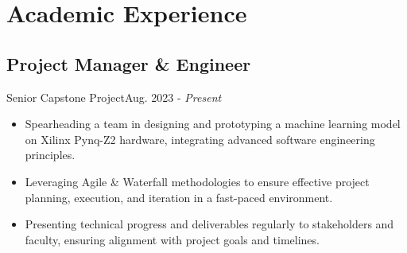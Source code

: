 \section{Academic Experience}
\subsection{Project Manager \& Engineer}{Senior Capstone Project}{Aug. 2023 - \textit{Present}}
\begin{itemize}
    \item Spearheading a team in designing and prototyping a machine learning model on Xilinx Pynq-Z2 hardware, integrating advanced software engineering principles.
    \item Leveraging Agile \& Waterfall methodologies to ensure effective project planning, execution, and iteration in a fast-paced environment.
    \item Presenting technical progress and deliverables regularly to stakeholders and faculty, ensuring alignment with project goals and timelines.
\end{itemize}